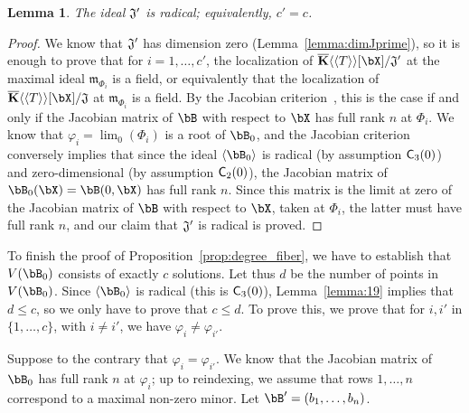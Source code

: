 \documentclass[12pt]{article}
\newtheorem{lemma}[definition]{Lemma}
\begin{document}
\begin{lemma}\label{lemma:Jprimerad}
  The ideal $\frak{J}'$ is radical; equivalently, $c'=c$.
\end{lemma}
\begin{proof}
  We know that $\frak{J}'$ has dimension zero
  (Lemma~\ref{lemma:dimJprime}), so it is enough to prove that for
  $i=1,\dots,c'$, the localization of
  $\KKbar\langle\langle T \rangle\rangle[\bX]/\frak{J}'$ at the
  maximal ideal $\mathfrak{m}_{\Phi_i}$ is a field, or equivalently
  that the localization of
  $\KKbar\langle\langle T \rangle\rangle[\bX]/\frak{J}$ at
  $\mathfrak{m}_{\Phi_i}$ is a field.  By the Jacobian
  criterion~\cite[Theorem~16.19.b]{Eisenbud95}, this is the case if
  and only if the Jacobian matrix of $\bB$ with respect to $\bX$ has
  full rank $n$ at $\Phi_i$. We know that $\varphi_i=\lim_0(\Phi_i)$
  is a root of $\bB_0$, and the Jacobian criterion conversely implies
  that since the ideal $\langle \bB_0 \rangle$ is radical (by
  assumption $\mathsf{C}_3(0)$) and zero-dimensional (by assumption
  $\mathsf{C}_2(0)$), the Jacobian matrix of $\bB_0(\bX)=\bB(0,\bX)$ has
  full rank $n$. Since this matrix is the limit at zero of the
  Jacobian matrix of $\bB$ with respect to $\bX$, taken at $\Phi_i$,
  the latter must have full rank $n$, and our claim that $\frak{J}'$
  is radical is proved.
\end{proof}

To finish the proof of Proposition~\ref{prop:degree_fiber}, we have to
establish that $V(\bB_0)$ consists of exactly $c$ solutions.  Let thus
$d$ be the number of points in $V(\bB_0)$.  Since $\langle \bB_0
\rangle$ is radical (this is $\mathsf{C}_3(0)$), Lemma~\ref{lemma:19}
implies that $d \le c$, so we only have to prove that $c \le d$. To
prove this, we prove that for $i,i'$ in $\{1,\dots,c\}$, with $i \ne
i'$, we have $\varphi_i \ne \varphi_{i'}$.

Suppose to the contrary that $\varphi_i = \varphi_{i'}$. We know that
the Jacobian matrix of $\bB_0$ has full rank $n$ at $\varphi_i$; up to
reindexing, we assume that rows $1,\dots,n$ correspond to a maximal
non-zero minor. Let $\bB'=(b_1,\dots,b_n)$.
\end{document}
